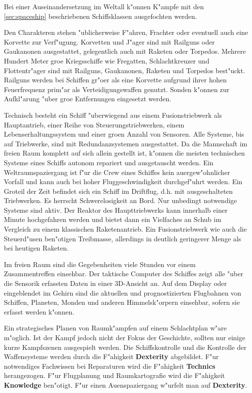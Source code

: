 Bei einer Auseinandersetzung im Weltall k"onnen K"ampfe mit den \cref{sec:spaceship} beschriebenen Schiffsklassen ausgefochten werden.

Den Charakteren stehen "ublicherweise F"ahren, Frachter oder eventuell auch eine Korvette zur Verf"ugung. Korvetten und J"ager sind mit Railguns oder Gau\3kanonen ausgestattet, gelegentlich auch mit Raketen oder Torpedos. Mehrere Hundert Meter gro\3e Kriegsschiffe wie Fregatten, Schlachtkreuzer und Flottentr"ager sind mit Railguns, Gau\3kanonen, Raketen und Torpedos best"uckt. Railguns werden bei Schiffen gr"o\3er als eine Korvette aufgrund ihrer hohen Feuerfrequenz prim"ar als Verteidigungswaffen genutzt. Sonden k"onnen zur Aufkl"arung "uber gro\3e Entfernungen eingesetzt werden.

Technisch besteht ein Schiff "uberwiegend aus einem Fusionstriebwerk als Hauptantrieb, einer Reihe von Steuerungstriebwerken, einem Lebenserhaltungssystem und einer gro\3en Anzahl von Sensoren. Alle Systeme, bis auf Triebwerke, sind mit Redundanzsystemen ausgestattet. Da die Mannschaft im freien Raum komplett auf sich allein gestellt ist, k"onnen die meisten technischen Systeme eines Schiffs autonom repariert und ausgetauscht werden. Ein Weltraumspaziergang ist f"ur die Crew eines Schiffes kein au\3ergew"ohnlicher Vorfall und kann auch bei hoher Fluggeschwindigkeit durchgef"uhrt werden. Ein Gro\3teil der Zeit befindet sich ein Schiff im Driftflug, d.h. mit ausgeschalteten Triebwerken. Es herrscht Schwerelosigkeit an Bord. Nur unbedingt notwendige Systeme sind aktiv. Der Reaktor des Haupttriebwerks kann innerhalb einer Minute hochgefahren werden und bietet dann ein Vielfaches an Schub im Vergleich zu einem klassischen Raketenantrieb. Ein Fusionstriebwerk wie auch die Steuerd"usen ben"otigen Treibmasse, allerdings in deutlich geringerer Menge als bei heutigen Raketen.

Im freien Raum sind die Gegebenheiten viele Stunden vor einem Zusammentreffen einsehbar. Der taktische Computer des Schiffes zeigt alle "uber die Sensorik erfassten Daten in einer 3D-Ansicht an. Auf dem Display oder eingeblendet im Gehirn sind die aktuellen und prognostizierten Flugbahnen von Schiffen, Planeten, Monden und anderen Himmelsk"orpern einsehbar, sofern sie erfasst werden k"onnen.

Ein strategisches Planen von Raumk"ampfen auf einem Schlachtplan w"are m"oglich. Ist der Kampf jedoch nicht der Fokus der Geschichte, sollten nur einige kurze Kampfszenen ausgespielt werden. Die Schiffskontrolle und die Kontrolle der Waffensysteme werden durch die F"ahigkeit \textbf{Dexterity} abgebildet. F"ur notwendiges Fachwissen bei Reparaturen wird die F"ahigkeit \textbf{Technics} herangezogen. F"ur Flugplanung und Raumkartografie wird die F"ahigkeit \textbf{Knowledge} ben"otigt. F"ur einen Au\3enspaziergang w"urfelt man auf \textbf{Dexterity}.
